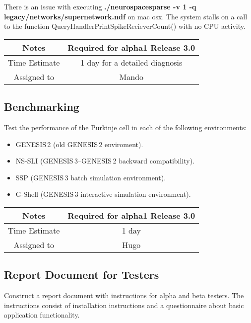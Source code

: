 \documentclass[12pt]{article}
\begin{document}
There is an issue with executing {\bf ./neurospacesparse -v 1 -q
  legacy/networks/supernetwork.ndf} on mac osx. The system stalls on a
call to the function QueryHandlerPrintSpikeRecieverCount() with no CPU
activity.

{
  \vspace{5mm}
  \centering
  \begin{tabular}{|c|c|}
    \hline
    Notes
    & Required for alpha1 Release 3.0 \\
    \hline
    Time Estimate
    & 1 day for a detailed diagnosis \\
    \hline
    Assigned to
    & Mando \\
    \hline
  \end{tabular}
}

\subsection{Benchmarking}

Test the performance of the Purkinje cell in each of the following
environments:

\begin{itemize}
\item GENESIS\,2 (old GENESIS\,2 enviroment).
\item NS-SLI (GENESIS\,3--GENESIS\,2 backward compatibility).
\item SSP (GENESIS\,3 batch simulation environment).
\item G-Shell (GENESIS\,3 interactive simulation environment).
\end{itemize}

{
  \vspace{5mm}
  \centering
  \begin{tabular}{|c|c|}
    \hline
    Notes
    & Required for alpha1 Release 3.0 \\
    \hline
    Time Estimate
    & 1 day \\
    \hline
    Assigned to
    & Hugo \\
    \hline
  \end{tabular}
}


\subsection{Report Document for Testers}

Construct a report document with instructions for alpha and beta
testers.  The instructions consist of installation instructions and a
questionnaire about basic application functionality.
\end{document}
